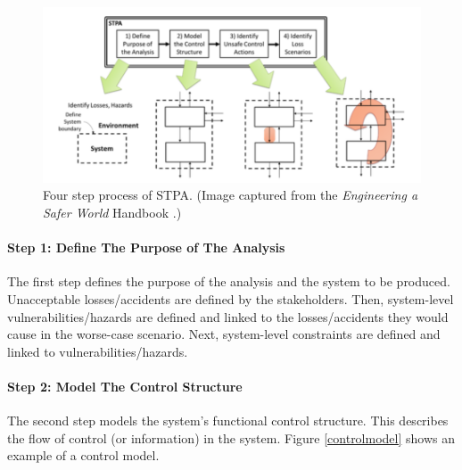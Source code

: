 \documentclass[../../main/main.tex]{subfiles}
\begin{document}
\begin{figure}[h]
\includegraphics[width=\linewidth]{../figures/4step}
\caption{\label{4step} Four step process of STPA. (Image captured from the \textit{Engineering a Safer World} Handbook \cite{safe}.)}
\end{figure}

\paragraph*{Step 1: Define The Purpose of The Analysis}
The first step defines the purpose of the analysis and the system to be produced.  Unacceptable losses/accidents are defined by the stakeholders.  Then, system-level vulnerabilities/hazards are defined and linked to the losses/accidents they would cause in the worse-case scenario.  Next, system-level constraints are defined and linked to vulnerabilities/hazards. 

\paragraph*{Step 2: Model The Control Structure}
The second step models the system's functional control structure.  This describes the flow of control (or information) in the system.  Figure \ref{controlmodel} shows an example of a control model.  
\end{document}
